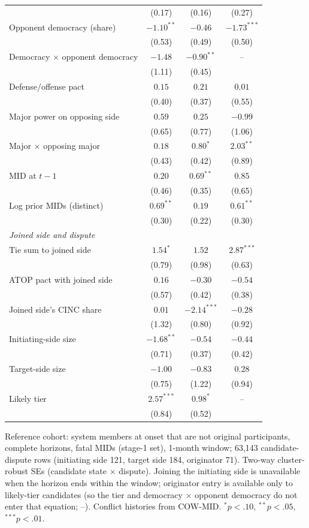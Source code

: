 \begin{table}[!htbp]
\begin{tabular}{lccc}
 & (0.17) & (0.16) & (0.27) \\
Opponent democracy (share) & $-1.10^{**}$ & $-0.46$ & $-1.73^{***}$ \\
 & (0.53) & (0.49) & (0.50) \\
Democracy $\times$ opponent democracy & $-1.48$ & $-0.90^{**}$ & -- \\
 & (1.11) & (0.45) &  \\
Defense/offense pact & $0.15$ & $0.21$ & $0.01$ \\
 & (0.40) & (0.37) & (0.55) \\
Major power on opposing side & $0.59$ & $0.25$ & $-0.99$ \\
 & (0.65) & (0.77) & (1.06) \\
Major $\times$ opposing major & $0.18$ & $0.80^{*}$ & $2.03^{**}$ \\
 & (0.43) & (0.42) & (0.89) \\
MID at $t-1$ & $0.20$ & $0.69^{**}$ & $0.85$ \\
 & (0.46) & (0.35) & (0.65) \\
Log prior MIDs (distinct) & $0.69^{**}$ & $0.19$ & $0.61^{**}$ \\
 & (0.30) & (0.22) & (0.30) \\
\midrule
\multicolumn{4}{l}{\emph{Joined side and dispute}} \\
Tie sum to joined side & $1.54^{*}$ & $1.52$ & $2.87^{***}$ \\
 & (0.79) & (0.98) & (0.63) \\
ATOP pact with joined side & $0.16$ & $-0.30$ & $-0.54$ \\
 & (0.57) & (0.42) & (0.38) \\
Joined side's CINC share & $0.01$ & $-2.14^{***}$ & $-0.28$ \\
 & (1.32) & (0.80) & (0.92) \\
Initiating-side size & $-1.68^{**}$ & $-0.54$ & $-0.44$ \\
 & (0.71) & (0.37) & (0.42) \\
Target-side size & $-1.00$ & $-0.83$ & $0.28$ \\
 & (0.75) & (1.22) & (0.94) \\
Likely tier & $2.57^{***}$ & $0.98^{*}$ & -- \\
 & (0.84) & (0.52) &  \\
\bottomrule
\end{tabular}
\begin{minipage}{0.95\linewidth}\footnotesize\smallskip Reference cohort: system members at onset that are not original participants, complete horizons, fatal MIDs (stage-1 set), 1-month window; 63,143 candidate-dispute rows (initiating side 121, target side 184, originator 71). Two-way cluster-robust SEs (candidate state $\times$ dispute). Joining the initiating side is unavailable when the horizon ends within the window; originator entry is available only to likely-tier candidates (so the tier and democracy $\times$ opponent democracy do not enter that equation; --). Conflict histories from COW-MID. $^{*}p<.10$, $^{**}p<.05$, $^{***}p<.01$.\end{minipage}
\end{table}

